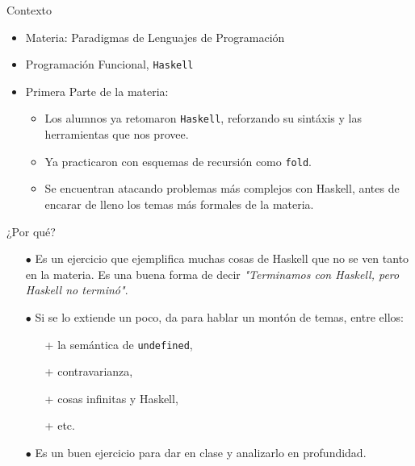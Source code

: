 \documentclass[pdf]{beamer}
\begin{document}
\begin{frame}{Contexto}
\begin{itemize}
\item Materia: Paradigmas de Lenguajes de Programación
\pause
\item Programación Funcional, \texttt{Haskell}
\pause

\item Primera Parte de la materia:
\begin{itemize}
\item Los alumnos ya retomaron \texttt{Haskell}, reforzando su sintáxis y las herramientas que nos provee.

\item Ya practicaron con esquemas de recursión como \texttt{fold}.

\item Se encuentran atacando problemas más complejos con Haskell, antes de
encarar de lleno los temas más formales de la materia. 

\end{itemize}


\end{itemize}

\end{frame}


\begin{frame}{¿Por qué?}

\begin{itemize}
\item[$\bullet$] Es un ejercicio que ejemplifica muchas cosas de Haskell que no se ven tanto en la materia. Es una buena forma de decir \textit{"Terminamos con Haskell, pero Haskell no terminó"}.

\item[$\bullet$] Si se lo extiende un poco, da para hablar un montón de temas, entre ellos:
\begin{itemize}
\item[+] la semántica de \texttt{undefined},
\item[+] contravarianza,
\item[+] cosas infinitas y Haskell,
\item[+] etc.
\end{itemize}

\item[$\bullet$] Es un buen ejercicio para dar en clase y analizarlo en profundidad.


\end{itemize}

\end{frame}
\end{document}

